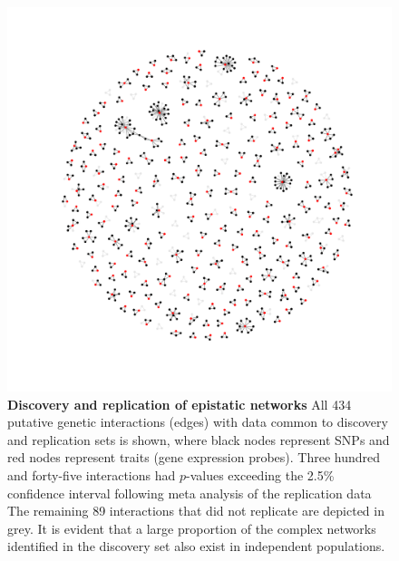 \documentclass{article}
\begin{document}
\begin{figure}[H]
	\centering
	\includegraphics[width=5in]{pale_gray_graph_of_interactions_2_lists_GrayEdges}
	\caption{\textbf{Discovery and replication of epistatic networks} All 434 putative genetic interactions (edges) with data common to discovery and replication sets is shown, where black nodes represent SNPs and red nodes represent traits (gene expression probes). Three hundred and forty-five interactions had $p$-values exceeding the 2.5\% confidence interval following meta analysis of the replication data The remaining 89 interactions that did not replicate are depicted in grey. It is evident that a large proportion of the complex networks identified in the discovery set also exist in independent populations.}
	\label{fig:fireworks}
\end{figure}
\clearpage
\end{document}
